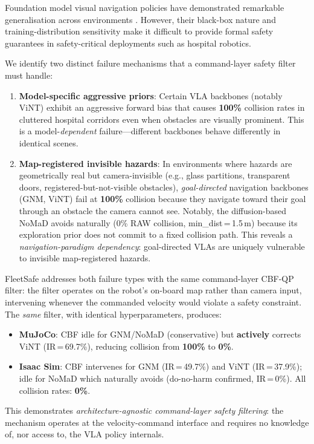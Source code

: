 \documentclass[letterpaper]{article}
\newcommand{\proven}[1]{\textcolor{ProvenGreen}{\textbf{#1}}}
\newcommand{\danger}[1]{\textcolor{DangerRed}{\textbf{#1}}}
\newcommand{\cbf}[1]{\textcolor{CbfAmber}{\textbf{#1}}}
\begin{document}
Foundation model visual navigation policies have demonstrated remarkable
generalisation across environments \cite{shah2023gnm,sridhar2024nomad,
majumdar2023vint}. However, their black-box nature and training-distribution
sensitivity make it difficult to provide formal safety guarantees in
safety-critical deployments such as hospital robotics.

We identify two distinct failure mechanisms that a command-layer safety
filter must handle:
\begin{enumerate}
  \item \textbf{Model-specific aggressive priors}: Certain VLA backbones
    (notably ViNT) exhibit an aggressive forward bias that causes
    \danger{100\%} collision rates in cluttered hospital corridors even
    when obstacles are visually prominent. This is a model-\emph{dependent}
    failure---different backbones behave differently in identical scenes.
  \item \textbf{Map-registered invisible hazards}: In environments where
    hazards are geometrically real but camera-invisible (e.g., glass
    partitions, transparent doors, registered-but-not-visible obstacles),
    \emph{goal-directed} navigation backbones (GNM, ViNT) fail at
    \danger{100\%} collision because they navigate toward their goal
    through an obstacle the camera cannot see.
    Notably, the diffusion-based NoMaD avoids naturally (0\% RAW collision,
    min\_dist\,=\,1.5\,m) because its exploration prior does not commit to
    a fixed collision path. This reveals a \emph{navigation-paradigm
    dependency}: goal-directed VLAs are uniquely vulnerable to invisible
    map-registered hazards.
\end{enumerate}

FleetSafe addresses both failure types with the same command-layer CBF-QP filter:
the filter operates on the robot's on-board map rather than camera input,
intervening whenever the commanded velocity would violate a safety constraint.
The \emph{same} filter, with identical hyperparameters, produces:
\begin{itemize}
  \item \textbf{MuJoCo}: CBF idle for GNM/NoMaD (conservative) but
    \cbf{actively} corrects ViNT (IR\,=\,69.7\%), reducing collision from
    \danger{100\%} to \proven{0\%}.
  \item \textbf{Isaac Sim}: CBF intervenes for GNM (IR\,=\,49.7\%) and ViNT
    (IR\,=\,37.9\%); idle for NoMaD which naturally avoids
    (do-no-harm confirmed, IR\,=\,0\%). All collision rates: \proven{0\%}.
\end{itemize}
This demonstrates \emph{architecture-agnostic command-layer safety filtering}:
the mechanism operates at the velocity-command interface and requires no knowledge
of, nor access to, the VLA policy internals.
\end{document}
